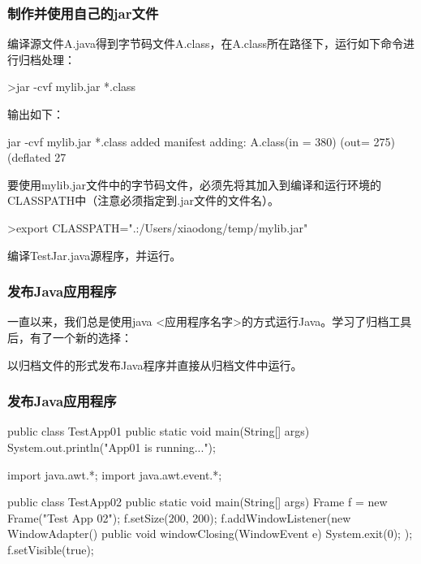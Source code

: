 \begin{frame}[fragile] %
  \frametitle{制作并使用自己的jar文件}

   编译源文件A.java得到字节码文件A.class，在A.class所在路径下，运行如下命令进行归档处理：

  \begin{shCode}
    >jar -cvf mylib.jar *.class  
  \end{shCode}

  输出如下：

  \begin{stdoutCode}
    jar -cvf mylib.jar *.class
    added manifest
    adding: A.class(in = 380) (out= 275)(deflated 27%
  \end{stdoutCode}

   要使用mylib.jar文件中的字节码文件，必须先将其加入到编译和运行环境的CLASSPATH中（注意必须指定到.jar文件的文件名）。

  \begin{shCode}
    >export CLASSPATH=".:/Users/xiaodong/temp/mylib.jar"
  \end{shCode}

   编译TestJar.java源程序，并运行。
\end{frame}

\begin{frame}[fragile] %
  \frametitle{发布Java应用程序}

  一直以来，我们总是使用java <应用程序名字>的方式运行Java。学习了归档工具后，有了一个新的选择：

  {\Blue\hei 以归档文件的形式发布Java程序并直接从归档文件中运行。}
\end{frame}

\begin{frame}[fragile] %
  \frametitle{发布Java应用程序}

  \begin{javaCode}
    public class TestApp01 {
      public static void main(String[] args) {
        System.out.println("App01 is running...");
      }
    }  
  \end{javaCode}


  \begin{javaCode}
    import java.awt.*;
    import java.awt.event.*;

    public class TestApp02 {
      public static void main(String[] args) {
        Frame f = new Frame("Test App 02");
        f.setSize(200, 200);
        f.addWindowListener(new WindowAdapter() {
          public void windowClosing(WindowEvent e) {
            System.exit(0);
          }
        });
        f.setVisible(true);
      }
    }
  \end{javaCode}
\end{frame}

